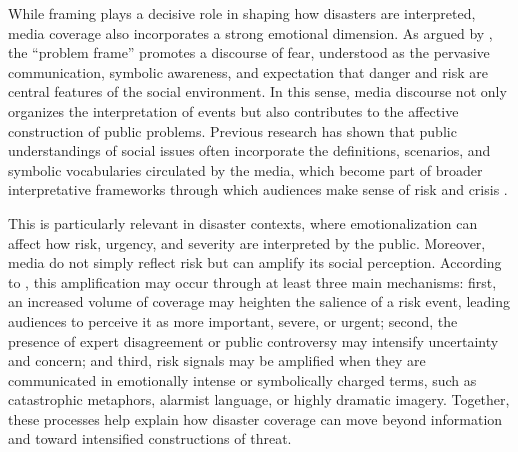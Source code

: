 While framing plays a decisive role in shaping how disasters are interpreted, media coverage also incorporates a strong emotional dimension. 
As argued by \textcite{Problem_Frame}, the “problem frame” promotes a discourse of fear, understood as the pervasive communication, symbolic awareness, and expectation that danger and 
risk are central features of the social environment. In this sense, media discourse not only organizes the interpretation of events but also contributes to the affective construction
 of public problems. Previous research has shown that public understandings of social issues often incorporate the definitions, scenarios, and symbolic vocabularies circulated by the media, 
 which become part of broader interpretative frameworks through which audiences make sense of risk and crisis \parencite{Encoding-Decoding,news_framming,Nisbet_Frames,  }.

This is particularly relevant in disaster contexts, where emotionalization can affect how risk, urgency, and severity are interpreted by the public. 
Moreover, media do not simply reflect risk but can amplify its social perception. According to \textcite{amplification_risk}, this amplification may occur through at 
least three main mechanisms: first, an increased volume of coverage may heighten the salience of a risk event, leading audiences to perceive it as more important, severe, 
or urgent; second, the presence of expert disagreement or public controversy may intensify uncertainty and concern; and third, risk signals may be amplified when 
they are communicated in emotionally intense or symbolically charged terms, such as catastrophic metaphors, alarmist language, or highly dramatic imagery. 
Together, these processes help explain how disaster coverage can move beyond information and toward intensified constructions of threat.

